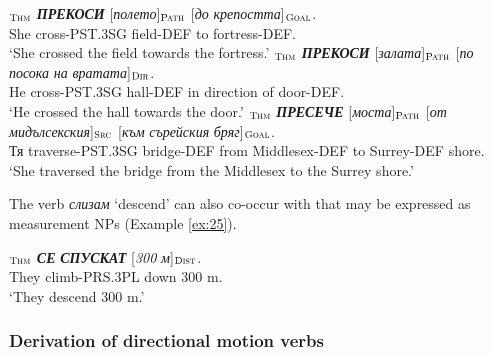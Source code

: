 \documentclass[output=paper,colorlinks,citecolor=brown]{langscibook}
\begin{document}
\begin{exe}
\ex \label{ex:24}
\begin{xlist}
\ex \label{ex:24:a}
\gll [\textit{Тя}]$_{\text{\textsc{Thm}}}$ \textit{\textbf{ПРЕКОСИ}} [\textit{полето}]$_{\text{\textsc{Path}}}$ [\textit{до} \textit{крепостта}]$_{\text{\textsc{Goal}}}$. \\
She cross-PST.3SG field-DEF to fortress-DEF. \\
\glt `She crossed the field towards the fortress.'
\ex  \label{ex:24:b}
$_{\text{\textsc{Thm}}}$ \textit{\textbf{ПРЕКОСИ}} [\textit{залата}]$_{\text{\textsc{Path}}}$ [\textit{по} \textit{посока} \textit{на}  \textit{вратата}]$_{\text{\textsc{Dir}}}$. \\
He cross-PST.3SG hall-DEF in direction of door-DEF. \\
\glt `He crossed the hall towards the door.'
\ex  \label{ex:24:c}
\gll [\textit{Тя}]$_{\text{\textsc{Thm}}}$ \textit{\textbf{ПРЕСЕЧЕ}} [\textit{моста}]$_{\text{\textsc{Path}}}$ [\textit{от} \textit{мидълсекския}]$_{\text{\textsc{Src}}}$ [\textit{към} \textit{сърейския} \textit{бряг}]$_{\text{\textsc{Goal}}}$. \\
Тя traverse-PST.3SG bridge-DEF from Middlesex-DEF to Surrey-DEF shore. \\
\glt `She traversed the bridge from the Middlesex to the Surrey shore.'
\end{xlist}
\end{exe}

The verb \textit{слизам} `descend’ can also co-occur with  that may be expressed as measurement NPs (Example \ref{ex:25}).

\begin{exe}
\ex  \label{ex:25}
\gll [\textit{Те}]$_{\text{\textsc{Thm}}}$ {\textit{\textbf{СЕ}} \textit{\textbf{СПУСКАТ}}} [\textit{300} \textit{м}]$_{\text{\textsc{Dist}}}$. \\
They {climb-PRS.3PL down} 300 m. \\
\glt `They descend 300 m.'
\end{exe}


\subsubsection{Derivation of directional motion verbs}\label{prefixes}
\end{document}
